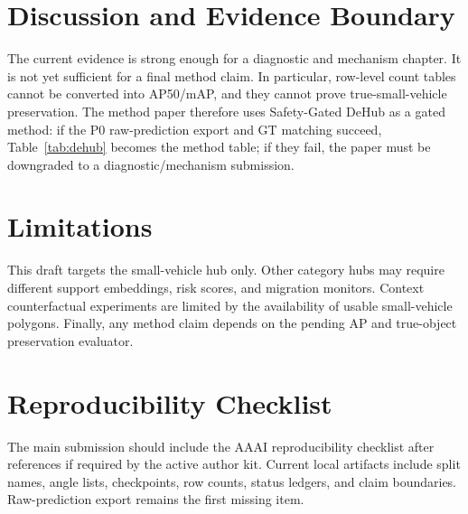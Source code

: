 \documentclass[letterpaper]{article}
\newcommand{\ours}{Safety-Gated DeHub}
\newcommand{\sv}{small-vehicle}
\begin{document}
\section{Discussion and Evidence Boundary}

The current evidence is strong enough for a diagnostic and mechanism chapter. It is not yet sufficient for a final method claim. In particular, row-level count tables cannot be converted into AP50/mAP, and they cannot prove true-\sv{} preservation. The method paper therefore uses \ours{} as a gated method: if the P0 raw-prediction export and GT matching succeed, Table~\ref{tab:dehub} becomes the method table; if they fail, the paper must be downgraded to a diagnostic/mechanism submission.

\section{Limitations}

This draft targets the \sv{} hub only. Other category hubs may require different support embeddings, risk scores, and migration monitors. Context counterfactual experiments are limited by the availability of usable \sv{} polygons. Finally, any method claim depends on the pending AP and true-object preservation evaluator.

\section*{Reproducibility Checklist}

The main submission should include the AAAI reproducibility checklist after references if required by the active author kit. Current local artifacts include split names, angle lists, checkpoints, row counts, status ledgers, and claim boundaries. Raw-prediction export remains the first missing item.



\end{document}
